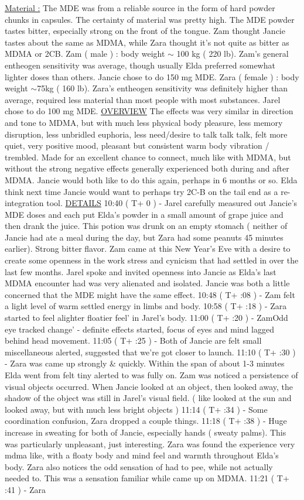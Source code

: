 \documentclass[12pt]{book}
\begin{document}
\underline{Material :} The MDE was from a reliable source in the form of hard powder chunks in capsules. The certainty of material was pretty high. The MDE powder tastes bitter, especially strong on the front of the tongue. Zam thought Jancie tastes about the same as MDMA, while Zara thought it's not quite as bitter as MDMA or 2CB. Zam ( male ) : body weight $\sim$ 100 kg ( 220 lb). Zam's general entheogen sensitivity was average, though usually Elda preferred somewhat lighter doses than others. Jancie chose to do 150 mg MDE. Zara ( female ) : body weight $\sim$75kg ( 160 lb). Zara's entheogen sensitivity was definitely higher than average, required less material than most people with most substances. Jarel chose to do 100 mg MDE. \underline{OVERVIEW} The effects was very similar in direction and tone to MDMA, but with much less physical body pleasure, less memory disruption, less unbridled euphoria, less need/desire to talk talk talk, felt more quiet, very positive mood, pleasant but consistent warm body vibration / trembled. Made for an excellent chance to connect, much like with MDMA, but without the strong negative effects generally experienced both during and after MDMA. Jancie would both like to do this again, perhaps in 6 months or so. Elda think next time Jancie would want to perhaps try 2C-B on the tail end as a re-integration tool. \underline{DETAILS} 10:40 ( T+ 0 ) - Jarel carefully measured out Jancie's MDE doses and each put Elda's powder in a small amount of grape juice and then drank the juice. This potion was drunk on an empty stomach ( neither of Jancie had ate a meal during the day, but Zara had some peanuts 45 minutes earlier). Strong bitter flavor. Zam came at this New Year's Eve with a desire to create some openness in the work stress and cynicism that had settled in over the last few months. Jarel spoke and invited openness into Jancie as Elda's last MDMA encounter had was very alienated and isolated. Jancie was both a little concerned that the MDE might have the same effect. 10:48 ( T+ :08 ) - Zam felt a light level of warm settled energy in limbs and body. 10:58 ( T+ :18 ) - Zara started to feel alighter floatier feel' in Jarel's body. 11:00 ( T+ :20 ) - ZamOdd eye tracked change' - definite effects started, focus of eyes and mind lagged behind head movement. 11:05 ( T+ :25 ) - Both of Jancie are felt small miscellaneous alerted, suggested that we're got closer to launch. 11:10 ( T+ :30 ) - Zara was came up strongly \& quickly. Within the span of about 1-3 minutes Elda went from felt tiny alerted to was fully on. Zam was noticed a persistence of visual objects occurred. When Jancie looked at an object, then looked away, the shadow of the object was still in Jarel's visual field. ( like looked at the sun and looked away, but with much less bright objects ) 11:14 ( T+ :34 ) - Some coordination confusion, Zara dropped a couple things. 11:18 ( T+ :38 ) - Huge increase in sweating for both of Jancie, especially hands ( sweaty palms). This was particularly unpleasant, just interesting. Zara was found the experience very mdma like, with a floaty body and mind feel and warmth throughout Elda's body. Zara also notices the odd sensation of had to pee, while not actually needed to. This was a sensation familiar while came up on MDMA. 11:21 ( T+ :41 ) - Zara 
\end{document}
